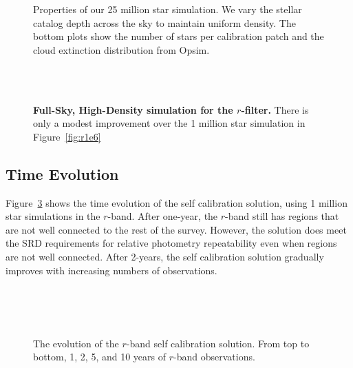 \documentclass[12pt,preprint]{aastex}
\begin{document}
\begin{figure}
\caption{Properties of our 25 million star simulation.  We vary the stellar catalog depth across the sky to maintain uniform density.  The bottom plots show the number of stars per calibration patch and the cloud extinction distribution from Opsim. \label{fig:25mil_about}}
\end{figure}

\begin{figure}
 \\
 \\
\caption{ {\bf Full-Sky, High-Density simulation for the $r$-filter.}  There is only a modest improvement over the 1 million star simulation in Figure~\ref{fig:r1e6}  \label{fig:25mil}}
\end{figure}


\subsection{Time Evolution}

Figure~\ref{fig:timeevo} shows the time evolution of the self calibration solution, using 1 million star simulations in the $r$-band.  After one-year, the $r$-band still has regions that are not well connected to the rest of the survey.  However, the solution does meet the SRD requirements for relative photometry repeatability even when regions are not well connected.  After 2-years, the self calibration solution gradually improves with increasing numbers of observations.  



\begin{figure}
 \\
 \\
 \\
\caption{The evolution of the $r$-band self calibration solution.  From top to bottom, 1, 2, 5, and 10 years of $r$-band observations.   \label{fig:timeevo}}
\end{figure}
\end{document}

